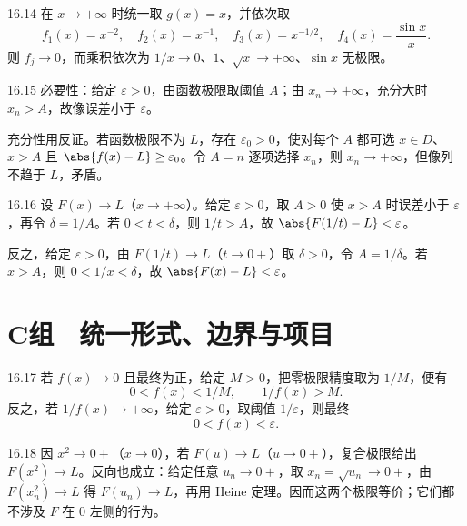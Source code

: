 \begin{solution}{16.14}
在 \(x\to+\infty\) 时统一取 \(g(x)=x\)，并依次取
\[
 f_1(x)=x^{-2},\quad f_2(x)=x^{-1},\quad
 f_3(x)=x^{-1/2},\quad f_4(x)=\frac{\sin x}{x}.
\]
则 \(f_j\to0\)，而乘积依次为 \(1/x\to0\)、\(1\)、\(\sqrt x\to+\infty\)、\(\sin x\) 无极限。
\end{solution}

\begin{solution}{16.15}
必要性：给定 \(\varepsilon>0\)，由函数极限取阈值 \(A\)；由 \(x_n\to+\infty\)，充分大时 \(x_n>A\)，故像误差小于 \(\varepsilon\)。

充分性用反证。若函数极限不为 \(L\)，存在 \(\varepsilon_0>0\)，使对每个 \(A\) 都可选 \(x\in D\)、\(x>A\) 且 \(\abs{f(x)-L}\ge\varepsilon_0\)。令 \(A=n\) 逐项选择 \(x_n\)，则 \(x_n\to+\infty\)，但像列不趋于 \(L\)，矛盾。
\end{solution}

\begin{solution}{16.16}
设 \(F(x)\to L\)（\(x\to+\infty\)）。给定 \(\varepsilon>0\)，取 \(A>0\) 使 \(x>A\) 时误差小于 \(\varepsilon\)，再令 \(\delta=1/A\)。若 \(0<t<\delta\)，则 \(1/t>A\)，故 \(\abs{F(1/t)-L}<\varepsilon\)。

反之，给定 \(\varepsilon>0\)，由 \(F(1/t)\to L\)（\(t\to0+\)）取 \(\delta>0\)，令 \(A=1/\delta\)。若 \(x>A\)，则 \(0<1/x<\delta\)，故 \(\abs{F(x)-L}<\varepsilon\)。
\end{solution}

\section*{C组　统一形式、边界与项目}

\begin{solution}{16.17}
若 \(f(x)\to0\) 且最终为正，给定 \(M>0\)，把零极限精度取为 \(1/M\)，便有
\[
 0<f(x)<1/M,\qquad1/f(x)>M.
\]
反之，若 \(1/f(x)\to+\infty\)，给定 \(\varepsilon>0\)，取阈值 \(1/\varepsilon\)，则最终
\[
 0<f(x)<\varepsilon.
\]
\end{solution}

\begin{solution}{16.18}
因 \(x^2\to0+\)（\(x\to0\)），若 \(F(u)\to L\)（\(u\to0+\)），复合极限给出 \(F(x^2)\to L\)。反向也成立：给定任意 \(u_n\to0+\)，取 \(x_n=\sqrt{u_n}\to0+\)，由 \(F(x_n^2)\to L\) 得 \(F(u_n)\to L\)，再用 Heine 定理。因而这两个极限等价；它们都不涉及 \(F\) 在 \(0\) 左侧的行为。
\end{solution}

